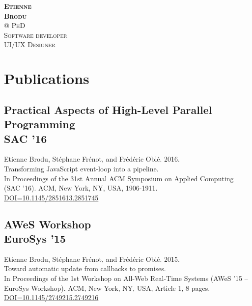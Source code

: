 
\usepackage[english]{babel}


\pagestyle{empty}

	{%
		\textbf{\textsc{Etienne}\\
			      \textsc{Brodu}}\\\vspace{0.2cm}
			      @
	}
	{%
		\textsc{PhD}\\
		\textsc{Software developer}\\
		\textsc{UI/UX Designer}
	}

\section{Publications}

	\subsection{Practical Aspects of High-Level Parallel Programming\\SAC '16}{
		Etienne Brodu, Stéphane Frénot, and Frédéric Oblé. 2016.\\
		Transforming JavaScript event-loop into a pipeline.\\
		In Proceedings of the 31st Annual ACM Symposium on Applied Computing (SAC '16).
		ACM, New York, NY, USA, 1906-1911.\\
		\href{http://dx.doi.org/10.1145/2851613.2851745}{DOI=10.1145/2851613.2851745}
	}

	\subsection{AWeS Workshop\\EuroSys '15}{
		Etienne Brodu, Stéphane Frénot, and Frédéric Oblé. 2015.\\
		Toward automatic update from callbacks to promises.\\
		In Proceedings of the 1st Workshop on All-Web Real-Time Systems (AWeS '15 – EuroSys Workshop).
		ACM, New York, NY, USA, Article 1, 8 pages.\\
		\href{http://doi.acm.org/10.1145/2749215.2749216}{DOI=10.1145/2749215.2749216}
	}

